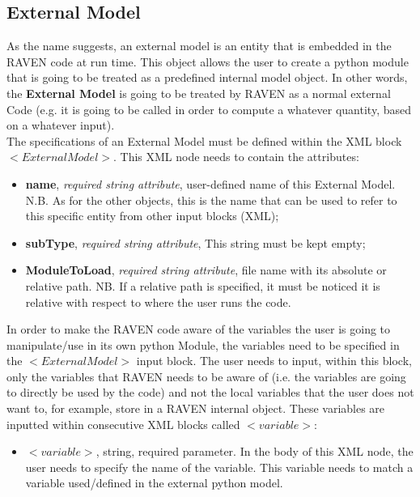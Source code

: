 \subsection{External Model}
\label{subsec:models_externalModel}
As the name suggests, an external model  is an entity that is embedded in the RAVEN code at run time. This object allows the user to create a python module that is going to be treated as a predefined internal model object. 
In other words, the \textbf{External Model} is going to be treated by RAVEN as a normal external Code (e.g. it is going to be called in order to compute a whatever quantity, based on a whatever input).
\\The specifications of an External Model must be defined within the XML block $<ExternalModel>$. This XML node needs to contain the attributes:
\vspace{-5mm}
\begin{itemize}
\itemsep0em
\item \textbf{name}, \textit{required string attribute}, user-defined name of this External Model. N.B. As for the other objects, this is the name that can be used to refer to this specific entity from other input blocks (XML);
\item \textbf{subType}, \textit{required string attribute}, This string must be kept empty;
\item \textbf{ModuleToLoad}, \textit{required string attribute}, file name with its absolute or relative path. NB. If a relative path is specified, it must be noticed it is relative with respect to where the user runs the code.
\end{itemize}
\vspace{-5mm}
In order to make the RAVEN code aware of the variables the user is going to manipulate/use in its own python Module, the variables need to be specified in the \textbf{$<ExternalModel>$} input block. The user needs to input, within this block, only the variables that RAVEN needs to be aware of (i.e. the variables are going to directly be used by the code) and not the local variables that the user does not want to, for example, store in a RAVEN internal object. These variables are inputted within consecutive XML blocks called $<variable>$:
\begin{itemize}
\item $<variable>$, string, required parameter. In the body of this XML node, the user needs to specify the name of the variable. This variable needs to match a variable used/defined in the external python model.
\end{itemize}
